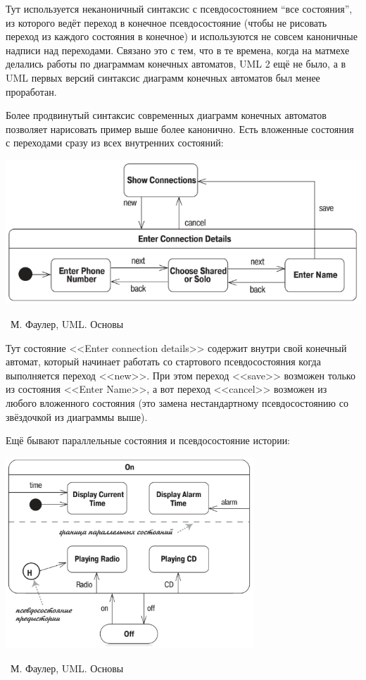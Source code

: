 \documentclass[a5paper]{article}
\newcommand{\attribution}[1] {
	\vspace{-5mm}\begin{flushright}\begin{scriptsize}%
	{\textcopyright\, #1}\end{scriptsize}\end{flushright}
}
\begin{document}
Тут используется неканоничный синтаксис с псевдосостоянием ``все состояния'', из которого ведёт переход в конечное псевдосостояние (чтобы не рисовать переход из каждого состояния в конечное) и используются не совсем каноничные надписи над переходами. Связано это с тем, что в те времена, когда на матмехе делались работы по диаграммам конечных автоматов, UML 2 ещё не было, а в UML первых версий синтаксис диаграмм конечных автоматов был менее проработан.

Более продвинутый синтаксис современных диаграмм конечных автоматов позволяет нарисовать пример выше более канонично. Есть вложенные состояния с переходами сразу из всех внутренних состояний:

\begin{center}
	\includegraphics[width=\textwidth]{stateTransitionNestedStates.png}
	\attribution{М. Фаулер, UML. Основы}
\end{center}

Тут состояние <<Enter connection details>> содержит внутри свой конечный автомат, который начинает работать со стартового псевдосостояния когда выполняется переход <<new>>. При этом переход <<save>> возможен только из состояния <<Enter Name>>, а вот переход <<cancel>> возможен из любого вложенного состояния (это замена нестандартному псевдосостоянию со звёздочкой из диаграммы выше).

Ещё бывают параллельные состояния и псевдосостояние истории:

\begin{center}
	\includegraphics[width=0.7\textwidth]{stateTransitionParallelStates.png}
	\attribution{М. Фаулер, UML. Основы}
\end{center}
\end{document}
